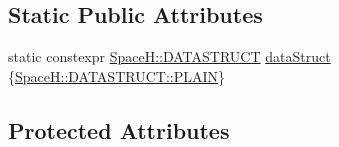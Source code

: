 \subsection*{Static Public Attributes}
\begin{DoxyCompactItemize}
\item 
static constexpr \mbox{\hyperlink{namespace_space_h_a4782f089179a3c269891f02482b072df}{Space\+H\+::\+D\+A\+T\+A\+S\+T\+R\+U\+CT}} \mbox{\hyperlink{class_vel_indep_particles_a6d357b21c216a2b079b1927c18de0b8f}{data\+Struct}} \{\mbox{\hyperlink{namespace_space_h_a0af19f79a6498e99dbda772053d44a72af62eb0bf5e5c72e80983fbbac1cb70e5}{Space\+H\+::\+D\+A\+T\+A\+S\+T\+R\+U\+C\+T\+::\+P\+L\+A\+IN}}\}
\end{DoxyCompactItemize}
\subsection*{Protected Attributes}
